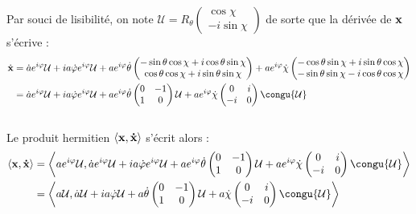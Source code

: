 \begin{demo}
	Par souci de lisibilité, on note $\mathcal{U} = R_{\theta} \begin{pmatrix} \cos\chi \\ -i\sin\chi \end{pmatrix}$ de sorte que la dérivée de $\bf{x}$ s'écrive :
	\begin{align*}
		\dot{\bf{x}} 
			&= \dot{a}e^{i\varphi}\mathcal{U} + ia\dot{\varphi}e^{i\varphi} \mathcal{U} + ae^{i\varphi}\dot{\theta}\begin{pmatrix} -\sin\theta \cos\chi + i\cos\theta \sin\chi \\ \cos\theta \cos\chi + i\sin\theta \sin\chi \end{pmatrix} + ae^{i\varphi}\dot{\chi}\begin{pmatrix} -\cos\theta \sin\chi + i\sin\theta \cos\chi \\ -\sin\theta \sin\chi - i\cos\theta \cos\chi \end{pmatrix} \\
			&= \dot{a}e^{i\varphi}\mathcal{U} + ia\dot{\varphi}e^{i\varphi} \mathcal{U} + ae^{i\varphi}\dot{\theta}\begin{pmatrix} 0 & -1 \\ 1 & 0 \end{pmatrix}\mathcal{U} + ae^{i\varphi}\dot{\chi}\begin{pmatrix} 0 & i \\ -i & 0 \end{pmatrix}\congu{\mathcal{U}}
	\end{align*}
	\\
	Le produit hermitien $\langle \bf{x}, \dot{\bf{x}}\rangle$ s'écrit alors :
	\begin{align*}
		\langle \bf{x}, \dot{\bf{x}}\rangle 
			&= \left\langle ae^{i\varphi}\mathcal{U}, \dot{a}e^{i\varphi}\mathcal{U} + ia\dot{\varphi}e^{i\varphi} \mathcal{U} + ae^{i\varphi}\dot{\theta}\begin{pmatrix} 0 & -1 \\ 1 & 0 \end{pmatrix}\mathcal{U} + ae^{i\varphi}\dot{\chi}\begin{pmatrix} 0 & i \\ -i & 0 \end{pmatrix}\congu{\mathcal{U}}\right\rangle \\
			&= \left\langle a\mathcal{U}, \dot{a}\mathcal{U} + ia\dot{\varphi} \mathcal{U} + a\dot{\theta}\begin{pmatrix} 0 & -1 \\ 1 & 0 \end{pmatrix}\mathcal{U} + a\dot{\chi}\begin{pmatrix} 0 & i \\ -i & 0 \end{pmatrix}\congu{\mathcal{U}}\right\rangle \\

\end{align*}
\end{demo}
